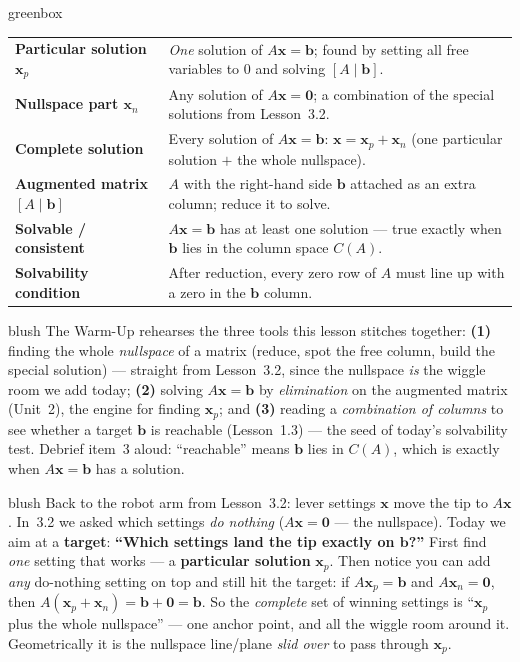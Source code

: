 \documentclass[10pt]{article}
\newcommand{\xx}{\mathbf{x}}
\newcommand{\bb}{\mathbf{b}}
\newcommand{\zero}{\mathbf{0}}
\begin{document}
\begin{skillbox}{greenbox}
\renewcommand{\arraystretch}{1.3}
\begin{tabularx}{\linewidth}{@{}l X@{}}
\textbf{Particular solution $\xx_p$} & \emph{One} solution of $A\xx=\bb$; found by setting all free variables to $0$ and solving $[A\mid\bb]$. \\
\textbf{Nullspace part $\xx_n$} & Any solution of $A\xx=\zero$; a combination of the special solutions from Lesson~3.2. \\
\textbf{Complete solution} & Every solution of $A\xx=\bb$: $\xx=\xx_p+\xx_n$ (one particular solution $+$ the whole nullspace). \\
\textbf{Augmented matrix $[A\mid\bb]$} & $A$ with the right-hand side $\bb$ attached as an extra column; reduce it to solve. \\
\textbf{Solvable / consistent} & $A\xx=\bb$ has at least one solution --- true exactly when $\bb$ lies in the column space $C(A)$. \\
\textbf{Solvability condition} & After reduction, every zero row of $A$ must line up with a zero in the $\bb$ column. \\
\end{tabularx}
\end{skillbox}

\begin{fixedskillbox}{blush}
    The Warm-Up rehearses the three tools this lesson stitches together:
    \textbf{(1)} finding the whole \emph{nullspace} of a matrix (reduce, spot the free column, build the
    special solution) --- straight from Lesson~3.2, since the nullspace \emph{is} the wiggle room we add
    today; \textbf{(2)} solving $A\xx=\bb$ by \emph{elimination} on the augmented matrix (Unit~2), the
    engine for finding $\xx_p$; and \textbf{(3)} reading a \emph{combination of columns} to see whether a
    target $\bb$ is reachable (Lesson~1.3) --- the seed of today's solvability test. Debrief item~3
    aloud: ``reachable'' means $\bb$ lies in $C(A)$, which is exactly when $A\xx=\bb$ has a solution.
\end{fixedskillbox}

\begin{skillbox}[Hook]{blush}
    Back to the robot arm from Lesson~3.2: lever settings $\xx$ move the tip to $A\xx$. In~3.2 we asked
    which settings \emph{do nothing} ($A\xx=\zero$ --- the nullspace). Today we aim at a \textbf{target}:
    \textbf{``Which settings land the tip exactly on $\bb$?''} First find \emph{one} setting that works
    --- a \textbf{particular solution} $\xx_p$. Then notice you can add \emph{any} do-nothing setting on
    top and still hit the target: if $A\xx_p=\bb$ and $A\xx_n=\zero$, then $A(\xx_p+\xx_n)=\bb+\zero=\bb$.
    So the \emph{complete} set of winning settings is ``$\xx_p$ plus the whole nullspace'' --- one anchor
    point, and all the wiggle room around it. Geometrically it is the nullspace line/plane \emph{slid
    over} to pass through $\xx_p$.
\end{skillbox}
\end{document}
